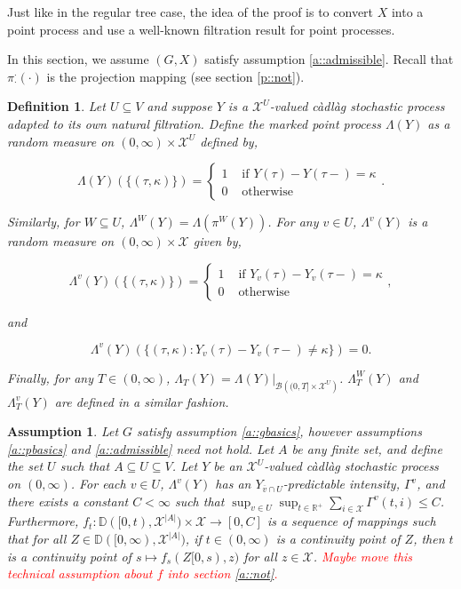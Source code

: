\documentclass[12pt]{article}
\newcommand{\mb}{\mathbb}
\newcommand{\mc}{\mathcal}
\newcommand{\ms}{\mathscr}
\newcommand{\ra}{\rightarrow}
\newcommand{\ov}{\overline}
\newcommand{\te}{\text}
\newcommand{\tr}{\textcolor{red}}
\newcommand{\ind}{\hspace{24pt}}
\newcommand{\cad}{\mb{D}}							%
\newcommand{\sta}{\mc{X}}							%
\newcommand{\cl}[1]{\ov{#1}}						%
\newcommand{\Xf}{X}									%
\newcommand{\proj}{\pi}								%
\newcommand{\vind}[1]{_{#1}}						%
\newcommand{\tme}[1]{(#1)}							%
\newcommand{\tmi}[1]{#1}							%
\newcommand{\vpara}[1]{^{#1}}						%
\newcommand{\tpara}[1]{_{#1}}						%
\newcommand{\Xg}{Y}
\newcommand{\pmap}{\Lambda}
\newcommand{\rt}{\tau}
\renewcommand{\mark}{\kappa}
\newcommand{\ratee}{\Gamma}
\newcommand{\Xh}{Z}
\newtheorem{defn}[thms]{Definition}
\newtheorem{assu}[thms]{Assumption}
\begin{document}
Just like in the regular tree case, the idea of the proof is to convert \(\Xf\) into a point process and use a well-known filtration result for point processes.

\ind In this section, we assume \((G,\Xf)\) satisfy assumption \ref{a::admissible}. Recall that \(\proj\vpara{\cdot}\tpara{\cdot}(\cdot)\) is the projection mapping (see section \ref{p::not}).

\begin{defn}
Let \(U\subseteq V\) and suppose \(\Xg\) is a \(\sta^U\)-valued c\`adl\`ag stochastic process adapted to its own natural filtration. Define the marked point process \(\pmap(\Xg)\) as a random measure on \((0,\infty) \times \sta^U\) defined by,

\[\pmap(\Xg)(\{(\rt,\mark)\}) = \begin{cases}
1 &\te{ if } \Xg\tme{\rt} - \Xg\tme{\rt-} = \mark\\
0 &\te{ otherwise}
\end{cases}.\]

Similarly, for \(W \subseteq U\), \(\pmap\vpara{W}(\Xg) = \pmap\left(\proj\vpara{W}(\Xg)\right)\). For any \(v\in U\), \(\pmap\vpara{v}(\Xg)\) is a random measure on \((0,\infty) \times \sta\) given by,

\[\pmap\vpara{v}(\Xg)(\{(\rt,\mark)\}) = \begin{cases}
1 &\te{ if } \Xg\vind{v}\tme{\rt} - \Xg\vind{v}\tme{\rt-} = \mark\\
0 &\te{ otherwise}
\end{cases},\]

and

\[\pmap\vpara{v}(\Xg)(\{(\rt,\mark): \Xg\vind{v}\tme{\rt} - \Xg\vind{v}\tme{\rt-} \neq \mark\}) = 0.\]

Finally, for any \(T\in (0,\infty)\), \(\pmap\tpara{T}(\Xg) = \pmap(\Xg)|_{\ms{B}\left((0,T]\times\sta^U\right)}\). \(\pmap\vpara{W}\tpara{T}(\Xg)\) and \(\pmap\vpara{v}\tpara{T}(\Xg)\) are defined in a similar fashion.
\label{Ex::pmap}
\end{defn}

\begin{assu}
Let \(G\) satisfy assumption \ref{a::gbasics}, however assumptions \ref{a::pbasics} and \ref{a::admissible} need not hold. Let \(A\) be any finite set, and define the set \(U\) such that \(A\subseteq U \subseteq V\). Let \(\Xg\) be an \(\sta^U\)-valued c\`adl\`ag stochastic process on \((0,\infty)\). For each \(v\in U\), \(\pmap\vpara{v}(\Xg)\) has an \(\Xg\vind{\cl{v}\cap U}\)-predictable intensity, \(\ratee\vpara{v}\), and there exists a constant \(C < \infty\) such that \(\sup_{v\in U}\sup_{t\in \mb{R}^+}\sum_{i \in \sta} \ratee\vpara{v}(t,i) \leq C\). Furthermore, \(f\tpara{t}: \cad([0,t),\sta^{|A|})\times \sta\ra[0,C]\) is a sequence of mappings such that for all \(\Xh \in \cad([0,\infty),\sta^{|A|})\), if \(t\in (0,\infty)\) is a continuity point of \(\Xh\), then \(t\) is a continuity point of \(s \mapsto f\tpara{s}(\Xh\tmi{[0,s)},z)\) for all \(z \in \sta\). \tr{Maybe move this technical assumption about \(f\) into section \ref{a::not}.}
\label{Ex::Eassu}
\end{assu}
\end{document}
